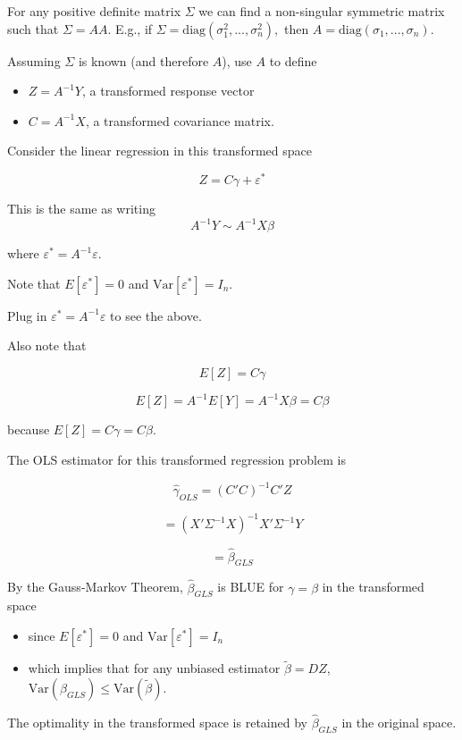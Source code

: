\documentclass[
  letterpaper,
  DIV=11,
  numbers=noendperiod]{scrreport}
\providecommand{\tightlist}{%
  \setlength{\itemsep}{0pt}\setlength{\parskip}{0pt}}\usepackage{longtable,booktabs,array}
\begin{document}
For any positive definite matrix \(\Sigma\) we can find a non-singular
symmetric matrix such that \(\Sigma = AA\). E.g., if
\(\Sigma = \text{diag}(\sigma_1^2, ..., \sigma_n^2),\) then
\(A = \text{diag}(\sigma_1, ..., \sigma_n)\).

Assuming \(\Sigma\) is known (and therefore \(A\)), use \(A\) to define

\begin{itemize}
\tightlist
\item
  \(Z = A^{-1} Y\), a transformed response vector
\item
  \(C = A^{-1} X\), a transformed covariance matrix.
\end{itemize}

Consider the linear regression in this transformed space

\[Z = C \gamma + \varepsilon^*
\]

This is the same as writing \[A^{-1} Y \sim A^{-1}X \beta
\]

where \(\varepsilon^* = A^{-1} \varepsilon\).

Note that \(E[\varepsilon^*] = 0\) and
\(\text{Var}[\varepsilon^*] = I_n\).

Plug in \(\varepsilon^* = A^{-1} \varepsilon\) to see the above.

Also note that

\[E[Z] = C \gamma \]

\[ E[Z] = A^{-1} E[Y] = A^{-1} X \beta = C \beta \]

because \(E[Z] = C\gamma = C\beta\).

The OLS estimator for this transformed regression problem is

\[\hat \gamma_{OLS} = (C'C)^{-1} C' Z
\]

\[ = (X'\Sigma^{-1}X)^{-1} X' \Sigma^{-1} Y
\]

\[ = \hat \beta_{GLS}
\]

By the Gauss-Markov Theorem, \(\hat \beta_{GLS}\) is BLUE for
\(\gamma = \beta\) in the transformed space

\begin{itemize}
\tightlist
\item
  since \(E[\varepsilon^*] = 0\) and \(\text{Var}[\varepsilon^*] = I_n\)
\item
  which implies that for any unbiased estimator \(\tilde{\beta} = DZ\),
  \(\text{Var}(\hat \beta_{GLS}) \leq \text{Var}(\tilde{\beta})\).
\end{itemize}

The optimality in the transformed space is retained by
\(\hat \beta_{GLS}\) in the original space.
\end{document}
